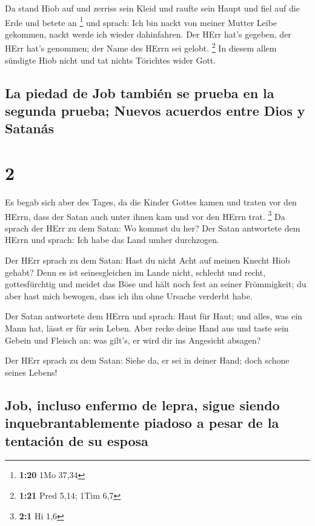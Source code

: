  Da stand Hiob auf und zerriss sein Kleid und raufte sein
Haupt und fiel auf die Erde und betete an \footnote{\textbf{1:20} 1Mo
  37,34}  und sprach: Ich bin nackt von meiner Mutter
Leibe gekommen, nackt werde ich wieder dahinfahren. Der HErr hat's
gegeben, der HErr hat's genommen; der Name des HErrn sei gelobt.
\footnote{\textbf{1:21} Pred 5,14; 1Tim 6,7}  In diesem
allem sündigte Hiob nicht und tat nichts Törichtes wider Gott.

\hypertarget{la-piedad-de-job-tambiuxe9n-se-prueba-en-la-segunda-prueba-nuevos-acuerdos-entre-dios-y-satanuxe1s}{%
\subsection{La piedad de Job también se prueba en la segunda prueba;
Nuevos acuerdos entre Dios y
Satanás}\label{la-piedad-de-job-tambiuxe9n-se-prueba-en-la-segunda-prueba-nuevos-acuerdos-entre-dios-y-satanuxe1s}}

\hypertarget{section-1}{%
\section{2}\label{section-1}}

 Es begab sich aber des Tages, da die Kinder Gottes kamen
und traten vor den HErrn, dass der Satan auch unter ihnen kam und vor
den HErrn trat. \footnote{\textbf{2:1} Hi 1,6}  Da sprach
der HErr zu dem Satan: Wo kommst du her? Der Satan antwortete dem HErrn
und sprach: Ich habe das Land umher durchzogen.

 Der HErr sprach zu dem Satan: Hast du nicht Acht auf
meinen Knecht Hiob gehabt? Denn es ist seinesgleichen im Lande nicht,
schlecht und recht, gottesfürchtig und meidet das Böse und hält noch
fest an seiner Frömmigkeit; du aber hast mich bewogen, dass ich ihn ohne
Ursache verderbt habe.

 Der Satan antwortete dem HErrn und sprach: Haut für Haut;
und alles, was ein Mann hat, lässt er für sein Leben. 
Aber recke deine Hand aus und taste sein Gebein und Fleisch an: was
gilt's, er wird dir ins Angesicht absagen?

 Der HErr sprach zu dem Satan: Siehe da, er sei in deiner
Hand; doch schone seines Lebens!

\hypertarget{job-incluso-enfermo-de-lepra-sigue-siendo-inquebrantablemente-piadoso-a-pesar-de-la-tentaciuxf3n-de-su-esposa}{%
\subsection{Job, incluso enfermo de lepra, sigue siendo
inquebrantablemente piadoso a pesar de la tentación de su
esposa}\label{job-incluso-enfermo-de-lepra-sigue-siendo-inquebrantablemente-piadoso-a-pesar-de-la-tentaciuxf3n-de-su-esposa}}

